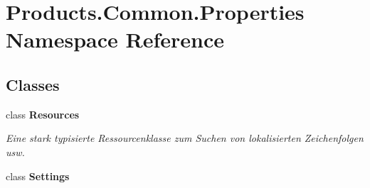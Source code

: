 \hypertarget{namespace_products_1_1_common_1_1_properties}{}\section{Products.\+Common.\+Properties Namespace Reference}
\label{namespace_products_1_1_common_1_1_properties}
\subsection*{Classes}
\begin{DoxyCompactItemize}
\item 
class {\bfseries Resources}
\begin{DoxyCompactList}\small\item\em Eine stark typisierte Ressourcenklasse zum Suchen von lokalisierten Zeichenfolgen usw. \end{DoxyCompactList}\item 
class {\bfseries Settings}
\end{DoxyCompactItemize}
